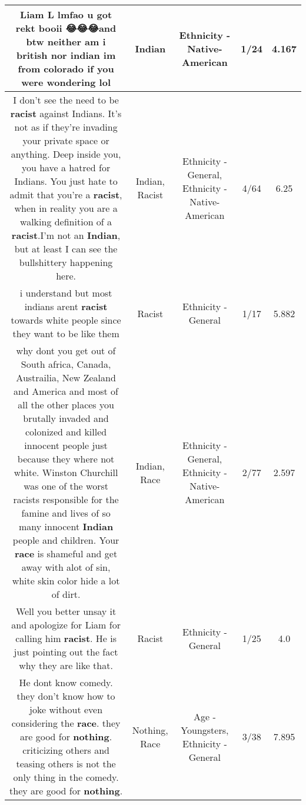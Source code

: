 \documentclass[11pt]{article}
\newlength\mylength
\begin{document}
\begin{center}
\begin{longtable}{|C{.65\mylength}|C{.30\mylength}|C{.12\mylength}|C{.12\mylength}|C{.12\mylength}|}
  \small Liam L lmfao u got rekt booii 😂😂😂and btw neither am i british nor \textbf{indian} im from colorado if you were wondering lol\normalsize   & Indian & Ethnicity - Native-American & 1/24 & 4.167 \\  \hline
  \small I don't see the need to be \textbf{racist} against Indians. It's not as if they're invading your private space or anything. Deep inside you, you have a hatred for Indians. You just hate to admit that you're a \textbf{racist}, when in reality you are a walking definition of a \textbf{racist}.I'm not an \textbf{Indian}, but at least I can see the bullshittery happening here.\normalsize   & Indian, Racist & Ethnicity - General, Ethnicity - Native-American & 4/64 & 6.25 \\  \hline
  \small i understand but most indians arent \textbf{racist} towards white people since they want to be like them\normalsize   & Racist & Ethnicity - General & 1/17 & 5.882 \\  \hline
  \small why dont you get out of South africa, Canada, Austrailia, New Zealand and America and most of all the other places you brutally invaded and colonized and killed innocent people just because they where not white. Winston Churchill was one of the worst racists responsible for the famine and lives of so many innocent \textbf{Indian} people and children. Your \textbf{race} is shameful and get away with alot of sin, white skin color hide a lot of dirt.\normalsize   & Indian, Race & Ethnicity - General, Ethnicity - Native-American & 2/77 & 2.597 \\  \hline
  \small Well you better unsay it and apologize for Liam for calling him \textbf{racist}. He is just pointing out the fact why they are like that.\normalsize   & Racist & Ethnicity - General & 1/25 & 4.0 \\  \hline
  \small He dont know comedy. they don't know how to joke without even considering the \textbf{race}. they are good for \textbf{nothing}. criticizing others and teasing others is not the only thing in the comedy. they are good for \textbf{nothing}.\normalsize   & Nothing, Race & Age - Youngsters, Ethnicity - General & 3/38 & 7.895 \\  \hline

\end{longtable}
\end{center}
\end{document}
